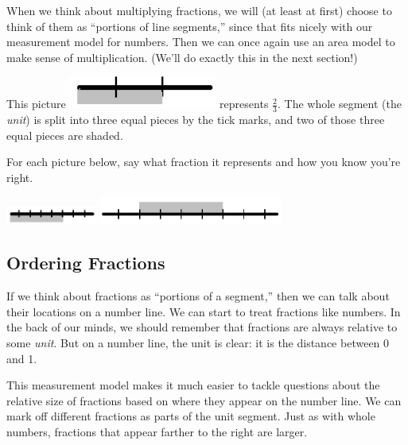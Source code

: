 When we think about multiplying fractions, we will (at least at first) choose to think of them as ``portions of line segments,'' since that fits nicely with our  measurement model for numbers.  Then we can once again use an area model to make sense of multiplication.  (We'll do exactly this in the next section!)



\begin{example}[Segments]
  This picture
\includegraphics[height = .5cm]{twothirdsseg}
represents $\frac 2 3$.  The whole segment (the \emph{unit}) is split into three equal pieces by the tick marks, and two of those three equal pieces are shaded.
\end{example}

\begin{thinkpair*}
For each picture below, say what fraction it represents and how you know you're right.

\begin{center}
\includegraphics[width = 3cm]{seg2}
\qquad
\qquad
\includegraphics[width = 6cm]{seg3}
\end{center}

\end{thinkpair*}




\subsection{Ordering Fractions}
If we think about fractions as ``portions of a segment,'' then we can talk about their locations on a number line.  We can start to treat fractions like  numbers.  In the back of our minds, we should remember that fractions are always relative to some \emph{unit}.  But on a number line, the unit is clear: it is the distance between 0 and 1.



This measurement model makes it much easier to tackle questions about the relative size of fractions based on where they appear on the number line.  We can mark off different fractions as parts of the unit segment.  Just as with whole numbers, fractions that appear farther to the right are larger.

